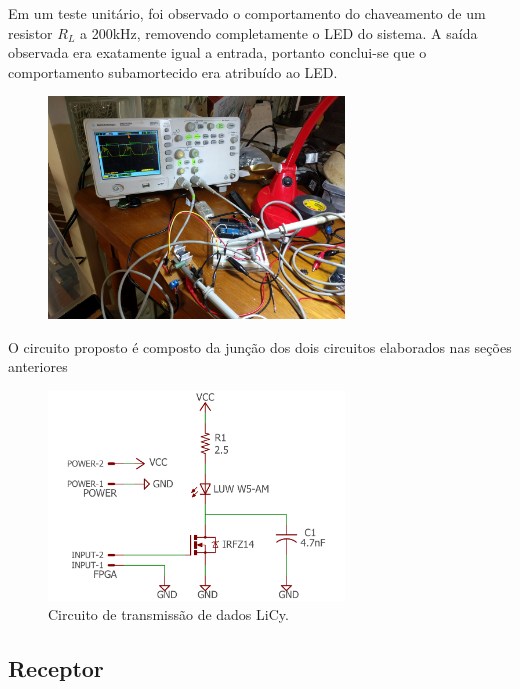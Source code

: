 		Em um teste unitário, foi observado o comportamento do chaveamento de um resistor $R_{L}$ a 200kHz, removendo completamente o LED do sistema. A saída observada era exatamente igual a entrada, portanto conclui-se que o comportamento subamortecido era atribuído ao LED.
		

		\begin{figure}[htb]
			\caption{\label{fig_transmitter_lify_circuit_fail0_r2} }
			\centering		%
			\includegraphics[width=0.7\textwidth, trim={1cm 0cm 2cm 1cm}, clip]{circuits/photos/TX_200k_without_filter.jpg}
		\end{figure}
		
		O circuito proposto é composto da junção dos dois circuitos elaborados nas seções anteriores
		\begin{figure}[htb]
			\caption{\label{fig_transmitter_lify_circuit} Circuito de transmissão de dados LiCy.}
			\centering		%
			\includegraphics[width=0.7\textwidth, trim={2cm 0cm 2cm 0cm}, clip]{circuits/transmitter_lify.pdf}
		\end{figure}
	
	
	\subsection{Receptor}
		
